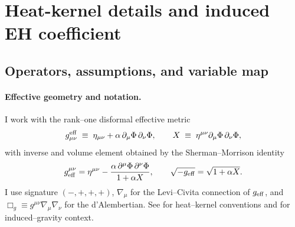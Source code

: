 \documentclass{iopjournal}
\begin{document}

\clearpage
\appendix
\renewcommand\thesection{\Alph{section}}
\renewcommand\thesubsection{\thesection.\arabic{subsection}}





\section{Heat-kernel details and induced EH coefficient}
\label{app:A}

\subsection{Operators, assumptions, and variable map}\label{app:A1}

\paragraph{Effective geometry and notation.}
I work with the rank–one disformal effective metric
\begin{equation}
g^{\rm eff}_{\mu\nu}\;\equiv\;\eta_{\mu\nu}+\alpha\,\partial_\mu\Phi\,\partial_\nu\Phi,
\qquad
X\;\equiv\;\eta^{\mu\nu}\partial_\mu\Phi\,\partial_\nu\Phi,
\label{eq:disformal_metric}
\end{equation}
with inverse and volume element obtained by the Sherman–Morrison identity
\begin{equation}
g_{\rm eff}^{\mu\nu}=\eta^{\mu\nu}-\frac{\alpha\,\partial^\mu\Phi\,\partial^\nu\Phi}{1+\alpha X},
\qquad
\sqrt{-g_{\rm eff}}=\sqrt{1+\alpha X}.
\label{eq:inverse_det}
\end{equation}
I use signature $(-,+,+,+)$, $\nabla_\mu$ for the Levi–Civita connection of $g_{\rm eff}$, and $\Box_{g}\equiv g^{\mu\nu}\nabla_\mu\nabla_\nu$ for the d’Alembertian. See \cite{DeWitt1965,BirrellDavies,ParkerToms,Avramidi2000,Vassilevich2003} for heat–kernel conventions and \cite{Sakharov1967,Donoghue1994} for induced–gravity context. 
\end{document}
